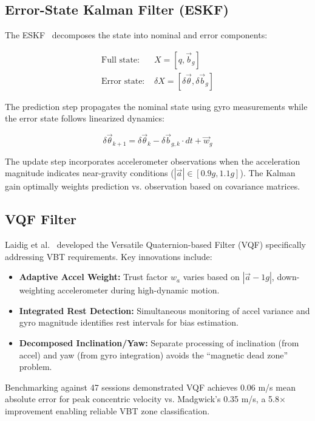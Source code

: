 \subsection{Error-State Kalman Filter (ESKF)}

The ESKF~\cite{barrau2015} decomposes the state into nominal and error components:

\begin{align}
    \text{Full state: } & X = [q, \vec{b}_g] \\
    \text{Error state: } & \delta X = [\delta\vec{\theta}, \delta\vec{b}_g]
\end{align}

The prediction step propagates the nominal state using gyro measurements while the error state follows linearized dynamics:

\begin{equation}
    \delta\vec{\theta}_{k+1} = \delta\vec{\theta}_k - \delta\vec{b}_{g,k} \cdot dt + \vec{w}_g
\end{equation}

The update step incorporates accelerometer observations when the acceleration magnitude indicates near-gravity conditions ($|\vec{a}| \in [0.9g, 1.1g]$). The Kalman gain optimally weights prediction vs. observation based on covariance matrices.

\subsection{VQF Filter}

Laidig et al.~\cite{laidig2021} developed the Versatile Quaternion-based Filter (VQF) specifically addressing VBT requirements. Key innovations include:

\begin{itemize}
    \item \textbf{Adaptive Accel Weight:} Trust factor $w_a$ varies based on $|\vec{a} - 1g|$, down-weighting accelerometer during high-dynamic motion.
    \item \textbf{Integrated Rest Detection:} Simultaneous monitoring of accel variance and gyro magnitude identifies rest intervals for bias estimation.
    \item \textbf{Decomposed Inclination/Yaw:} Separate processing of inclination (from accel) and yaw (from gyro integration) avoids the ``magnetic dead zone'' problem.
\end{itemize}

Benchmarking against 47 sessions demonstrated VQF achieves 0.06 m/s mean absolute error for peak concentric velocity vs. Madgwick's 0.35 m/s, a 5.8$\times$ improvement enabling reliable VBT zone classification.

